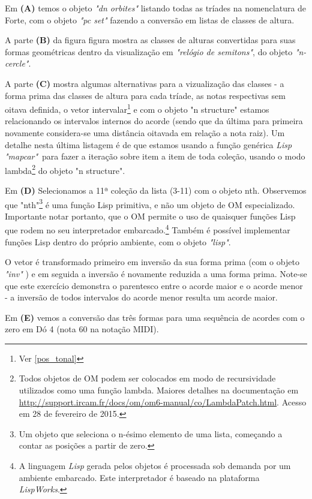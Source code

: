 \documentclass[
	12pt,				%
	openright,			%
	twoside,			%
	a4paper,			%
	english,			%
	french,				%
	spanish,			%
	brazil				%
	]{abntex2}
\begin{document}
Em \textbf{(A)} temos o objeto \textit{"dn orbites"} listando todas as tríades na nomenclatura de Forte, com o objeto \textit{"pc set"} fazendo a conversão em listas de classes de altura. 

A parte \textbf{(B)} da figura figura mostra as classes de alturas convertidas para suas formas geométricas dentro da visualização em \textit{"relógio de semitons"}, do objeto \textit{"n-cercle"}. 

A parte \textbf{(C)} mostra algumas alternativas para a vizualização das classes - a forma prima das classes de altura para cada tríade, as notas respectivas sem oitava definida, o vetor intervalar\footnote{Ver \autoref{pos_tonal}} e com o objeto "n structure" estamos relacionando os intervalos internos do acorde (sendo que da última para primeira novamente considera-se uma distância oitavada em relação a nota raiz). Um detalhe nesta última listagem é de que estamos usando a função genérica \textit{Lisp "mapcar"}\ para fazer a iteração sobre item a item de toda coleção, usando o modo lambda\footnote{Todos objetos de OM podem ser colocados em modo de recursividade utilizados como uma função lambda. Maiores detalhes na documentação em \url{http://support.ircam.fr/docs/om/om6-manual/co/LambdaPatch.html}. Acesso em 28 de fevereiro de 2015.} do objeto "n structure".

Em \textbf{(D)} Selecionamos a 11ª coleção da lista (3-11) com o objeto nth. Observemos que "nth"\footnote{Um objeto que seleciona o n-ésimo elemento de uma lista, começando a contar as posições a partir de zero.} é uma função Lisp primitiva, e não um objeto de OM especializado. Importante notar portanto, que o OM permite o uso de quaisquer funções Lisp que rodem no seu interpretador embarcado.\footnote{A linguagem \textit{Lisp} gerada pelos objetos é processada sob demanda por um ambiente embarcado. Este interpretador é baseado na plataforma \textit{LispWorks}. } Também é possível implementar funções Lisp dentro do próprio ambiente, com o objeto \textit{"lisp"}.

O vetor é transformado primeiro em inversão da sua forma prima (com o objeto \textit{"inv"} ) e em seguida a inversão é novamente reduzida a uma forma prima. Note-se que este exercício demonstra o parentesco entre o acorde maior e o acorde menor - a inversão de todos intervalos do acorde menor resulta um acorde maior.

Em \textbf{(E)} vemos a conversão das três formas para uma sequência de acordes com o zero em Dó 4 (nota 60 na notação MIDI).
 
\end{document}
